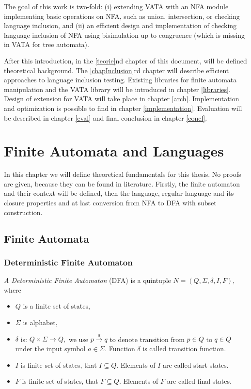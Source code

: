 The goal of this work is two-fold: (i) extending VATA with an NFA module implementing basic operations on NFA, such as union, intersection, or 
checking language inclusion, and (ii) an efficient design and implementation of checking language inclusion of NFA using 
bisimulation up to congruence (which is missing in VATA for tree automata).

After this introduction, in the \ref{teorie}nd chapter of this document, 
will be defined theoretical background. The \ref{chapInclusion}rd chapter will describe efficient approaches to language inclusion testing.
Existing libraries for finite automata manipulation and the VATA library will be introduced in chapter \ref{libraries}. 
Design of extension for VATA 
will take place in chapter \ref{arch}. Implementation and optimization is possible to find in chapter \ref{implementation}. Evaluation will be
described in chapter \ref{eval} and final conclusion in chapter \ref{concl}.
\chapter{Finite Automata and Languages}
In this chapter we will define theoretical fundamentals for this thesis. No proofs are given, because they can be found in literature. 
Firstly, the finite automaton and their context will be defined, then the language, regular language and its closure properties and at last conversion from
NFA to DFA with subset construction. 
\label{teorie}
\section{Finite Automata}
\label{defFA}

	\subsection{Deterministic Finite Automaton}
	\label{defDFA}
	\begin{definition}
		\emph{A Deterministic Finite Automaton} (DFA) is a quintuple $N=(Q,\Sigma,\delta,I,F)$, where
		\begin{itemize}
			\item $Q$ is a finite set of states,
			\item $\Sigma$ is alphabet,
			\item $\delta$ is: $Q \times \Sigma \rightarrow Q,$ we use $p \xrightarrow{a} q$ to denote  transition from $p \in Q$ to $q \in Q$ 
under the input symbol $a \in \Sigma$. 
Function $\delta$ is called transition function.
			\item $I$ is finite set of states, that $I \subseteq Q$. Elements of $I$ are called start states.
			\item $F$ is finite set of states, that $F \subseteq Q$. Elements of $F$ are called final states.
		\end{itemize}
	\end{definition}

